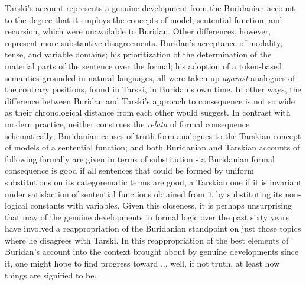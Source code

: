\documentclass[]{article}
\begin{document}
Tarski's account represents a genuine development from the Buridanian account to the degree that it employs the concepts of model, sentential function, and recursion, which were unavailable to Buridan. Other differences, however, represent more substantive disagreements. Buridan's acceptance of modality, tense, and variable domains; his prioritization of the determination of the material parts of the sentence over the formal; his adoption of a token-based semantics grounded in natural languages, all were taken up \textit{against} analogues of the contrary positions, found in Tarski, in Buridan's own time. In other ways, the difference between Buridan and Tarski's approach to consequence is not so wide as their chronological distance from each other would suggest. In contrast with modern practice, neither construes the \textit{relata} of formal consequence schematically; Buridanian causes of truth form analogues to the Tarskian concept of models of a sentential function; and both Buridanian and Tarskian accounts of following formally are given in terms of substitution - a Buridanian formal consequence is good if all sentences that could be formed by uniform substitutions on its categorematic terms are good, a Tarskian one if it is invariant under satisfaction of sentential functions obtained from it by substituting its non-logical constants with variables. Given this closeness, it is perhaps unsurprising that may of the genuine developments in formal logic over the past sixty years have involved a reappropriation of the Buridanian standpoint on just those topics where he disagrees with Tarski. In this reappropriation of the best elements of Buridan's account into the context brought about by genuine developments since it, one might hope to find progress toward ... well, if not truth, at least how things are signified to be.
\printbibliography
\end{document}

